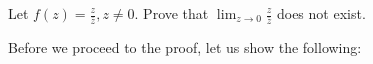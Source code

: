 

\begin{example}\label{example:5.2}
    Let $f(z) = \frac{z}{\bar{z}}, z \neq 0$. Prove that $\lim_{z \to 0} \frac{z}{\bar{z}}$ does not exist.
\end{example}

Before we proceed to the proof, let us show the following:

